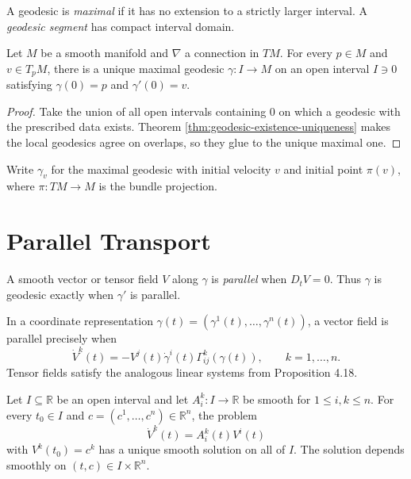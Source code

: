 A geodesic is \emph{maximal} if it has no extension to a strictly larger interval.
A \emph{geodesic segment} has compact interval domain.

\begin{corollary}
\label{cor:existence-of-maximal-geodesic}


Let $M$ be a smooth manifold and $\nabla$ a connection in $TM$. For every
$p\in M$ and $v\in T_pM$, there is a unique maximal geodesic
$\gamma\colon I\to M$ on an open interval $I\ni0$ satisfying
$\gamma(0)=p$ and $\gamma'(0)=v$.

\end{corollary}

\begin{proof}
\sketch Take the union of all open intervals containing $0$ on which a geodesic
with the prescribed data exists. Theorem \ref{thm:geodesic-existence-uniqueness}
makes the local geodesics agree on overlaps, so they glue to the unique maximal
one.
\end{proof}

Write $\gamma_v$ for the maximal geodesic with initial velocity $v$ and initial
point $\pi(v)$, where $\pi\colon TM\to M$ is the bundle projection.

\section{Parallel Transport}

A smooth vector or tensor field $V$ along $\gamma$ is \emph{parallel} when
$D_tV=0$. Thus $\gamma$ is geodesic exactly when $\gamma'$ is parallel.

In a coordinate representation $\gamma(t)=(\gamma^1(t),\ldots,\gamma^n(t))$,
a vector field is parallel precisely when
\begin{equation}
\dot V^k(t)=-V^j(t)\dot\gamma^i(t)\Gamma^k_{ij}(\gamma(t)),
\qquad k=1,\ldots,n. \tag{4.19}
\end{equation}
Tensor fields satisfy the analogous linear systems from Proposition 4.18.

\begin{theorem}
\label{thm:linear-ode-existence-uniqueness}



Let $I\subseteq\mathbb R$ be an open interval and let
$A_i^k\colon I\to\mathbb R$ be smooth for $1\leq i,k\leq n$. For every
$t_0\in I$ and $c=(c^1,\ldots,c^n)\in\mathbb R^n$, the problem
\begin{equation}
\dot V^k(t)=A_i^k(t)V^i(t) \tag{4.20}
\end{equation}
with $V^k(t_0)=c^k$ has a unique smooth solution on all of $I$. The solution
depends smoothly on $(t,c)\in I\times\mathbb R^n$.
\end{theorem}

